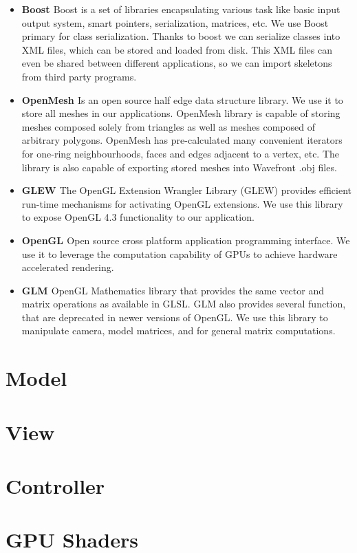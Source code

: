 \begin{itemize}
	\item \textbf{Boost \cite{Boost}} Boost is a set of libraries encapsulating various task like basic input output system, smart pointers, serialization, matrices, etc. We use Boost primary for class serialization. Thanks to boost we can serialize classes into XML files, which can be stored and loaded from disk. This XML files can even be shared between different applications, so we can import skeletons from third party programs.
	\item \textbf{OpenMesh \cite{OpenMesh}} Is an open source half edge data structure library. We use it to store all meshes in our applications. OpenMesh library is capable of storing meshes composed solely from triangles as well as meshes composed of arbitrary polygons. OpenMesh has pre-calculated many convenient iterators for one-ring neighbourhoods, faces and edges adjacent to a vertex, etc. The library is also capable of exporting stored meshes into Wavefront .obj files.
	\item \textbf{GLEW \cite{glew}} The OpenGL Extension Wrangler Library (GLEW) provides efficient run-time mechanisms for activating OpenGL extensions. We use this library to expose OpenGL 4.3 functionality to our application.
	\item \textbf{OpenGL \cite{opengl}} Open source cross platform application programming interface. We use it to leverage the computation capability of GPUs to achieve hardware accelerated rendering.
	\item \textbf{GLM \cite{glm}} OpenGL Mathematics library that provides the same vector and matrix operations as available in GLSL. GLM also provides several function, that are deprecated in newer versions of OpenGL. We use this library to manipulate camera, model matrices, and for general matrix computations.
\end{itemize}

\section{Model}

\section{View}

\section{Controller}

\section{GPU Shaders}
